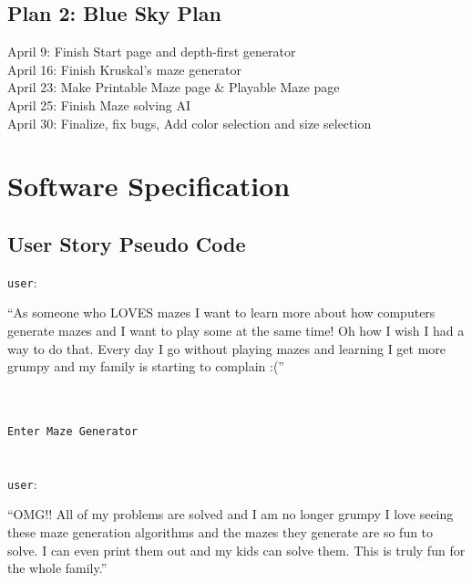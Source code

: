 \documentclass[12 pt]{article}
\begin{document}
\subsection{Plan 2: Blue Sky Plan}
\hspace*{\parindent} April 9: Finish Start page and depth-first generator\\
\hspace*{\parindent} April 16: Finish Kruskal's maze generator\\
\hspace*{\parindent} April 23: Make Printable Maze page \& Playable Maze page\\
\hspace*{\parindent} April 25: Finish Maze solving AI\\
\hspace*{\parindent} April 30: Finalize, fix bugs, Add color selection and size selection\\

\newpage
\section{Software Specification}
\hspace{\parindent}
\subsection{User Story Pseudo Code}
\verb|user|:
\hfill\begin{minipage}{\dimexpr\textwidth-1cm}
	``As someone who LOVES mazes I want to learn more about how computers generate mazes and I want to play some at the same time! Oh how I wish I had a way to do that. Every day I go without playing mazes and learning I get more grumpy and my family is starting to complain :(''
\end{minipage}\\ \\

\verb|Enter Maze Generator| \\ \\ \\
\verb|user|:
\hfill\begin{minipage}{\dimexpr\textwidth-1cm}
	``OMG!! All of my problems are solved and I am no longer grumpy I love seeing these maze generation algorithms and the mazes they generate are so fun to solve. I can even print them out and my kids can solve them. This is truly fun for the whole family.''
\end{minipage}
\end{document}
